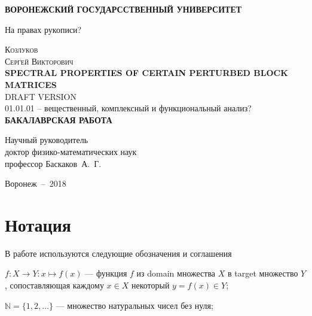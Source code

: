 \documentclass[14pt,a4paper]{extarticle}
\theoremstyle{definition}
\begin{document}

\newpage

\begin{center}
  \textbf{ВОРОНЕЖСКИЙ ГОСУДАРССТВЕННЫЙ УНИВЕРСИТЕТ}
\end{center}

\begin{flushright}
  На правах рукописи?
\end{flushright}

\vfill

\begin{center}
  \textsc{\Large
    Козлуков\\
    Сергей Викторович
  }
  \\[1.5cm]
  \textbf{SPECTRAL PROPERTIES OF CERTAIN PERTURBED BLOCK MATRICES}\\[.5cm]
  {\Huge DRAFT VERSION}\\[1.5cm]
  01.01.01 -- вещественный, комплексный и функциональный анализ?\\[1.5cm]
  \textbf{БАКАЛАВРСКАЯ РАБОТА}
\end{center}

\vfill
\begin{flushright}
  Научный руководитель\\
  доктор физико-математических наук\\
  профессор Баскаков~А.~Г.
\end{flushright}
 
\vfill
\begin{center}
  Воронеж~--~2018
\end{center}

\pagestyle{empty}
\newpage

\setcounter{tocdepth}{2}
\tableofcontents
\newpage


\section*{Нотация}

В работе используются следующие обозначения и соглашения

\( f: X\to Y: x\mapsto f(x) \) --- функция \( f \)
из domain множества \( X \) в target множество \( Y \),
сопоставляющая каждому \( x\in X \) некоторый \( y=f(x) \in Y\);

\( \mathbb{N} = \{ 1, 2, \ldots \}\) --- множество натуральных чисел без нуля;
\end{document}
